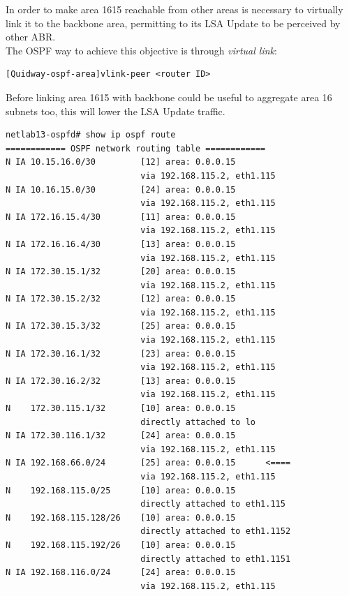 \documentclass{llncs}
\begin{document}
In order to make area 1615 reachable from other areas is necessary to virtually link it to the backbone area, permitting to its LSA Update to be perceived by other ABR.\\
The OSPF way to achieve this objective is through \emph{virtual link}:
\begin{verbatim}
[Quidway-ospf-area]vlink-peer <router ID>
\end{verbatim}
Before linking area 1615 with backbone could be useful to aggregate area 16 subnets too, this will lower the LSA Update traffic.
\\
\lstset{language=sh, caption=Routing table of router 192.168.115.1 after virtual link, basicstyle=\ttfamily\scriptsize , breaklines=true}
\begin{lstlisting}
netlab13-ospfd# show ip ospf route 
============ OSPF network routing table ============
N IA 10.15.16.0/30         [12] area: 0.0.0.15
                           via 192.168.115.2, eth1.115
N IA 10.16.15.0/30         [24] area: 0.0.0.15
                           via 192.168.115.2, eth1.115
N IA 172.16.15.4/30        [11] area: 0.0.0.15
                           via 192.168.115.2, eth1.115
N IA 172.16.16.4/30        [13] area: 0.0.0.15
                           via 192.168.115.2, eth1.115
N IA 172.30.15.1/32        [20] area: 0.0.0.15
                           via 192.168.115.2, eth1.115
N IA 172.30.15.2/32        [12] area: 0.0.0.15
                           via 192.168.115.2, eth1.115
N IA 172.30.15.3/32        [25] area: 0.0.0.15
                           via 192.168.115.2, eth1.115
N IA 172.30.16.1/32        [23] area: 0.0.0.15
                           via 192.168.115.2, eth1.115
N IA 172.30.16.2/32        [13] area: 0.0.0.15
                           via 192.168.115.2, eth1.115
N    172.30.115.1/32       [10] area: 0.0.0.15
                           directly attached to lo
N IA 172.30.116.1/32       [24] area: 0.0.0.15
                           via 192.168.115.2, eth1.115
N IA 192.168.66.0/24       [25] area: 0.0.0.15		<====
                           via 192.168.115.2, eth1.115
N    192.168.115.0/25      [10] area: 0.0.0.15
                           directly attached to eth1.115
N    192.168.115.128/26    [10] area: 0.0.0.15
                           directly attached to eth1.1152
N    192.168.115.192/26    [10] area: 0.0.0.15
                           directly attached to eth1.1151
N IA 192.168.116.0/24      [24] area: 0.0.0.15
                           via 192.168.115.2, eth1.115
\end{lstlisting}
\end{document}
